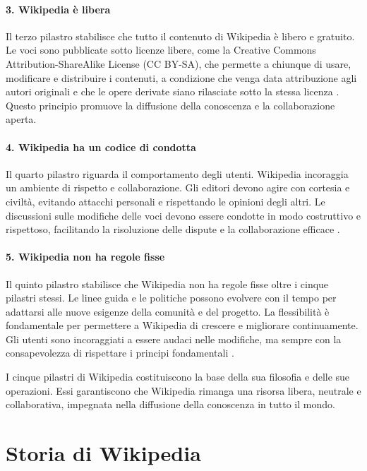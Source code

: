 \documentclass[12pt,a4paper]{report}
\begin{document}
\paragraph*{3. Wikipedia è libera}
Il terzo pilastro stabilisce che tutto il contenuto di Wikipedia è libero e gratuito. Le voci sono pubblicate sotto licenze libere, come la Creative Commons Attribution-ShareAlike License (CC BY-SA), che permette a chiunque di usare, modificare e distribuire i contenuti, a condizione che venga data attribuzione agli autori originali e che le opere derivate siano rilasciate sotto la stessa licenza \cite{jemielniak2014wikipedia}. Questo principio promuove la diffusione della conoscenza e la collaborazione aperta.

\paragraph*{4. Wikipedia ha un codice di condotta}
Il quarto pilastro riguarda il comportamento degli utenti. Wikipedia incoraggia un ambiente di rispetto e collaborazione. Gli editori devono agire con cortesia e civiltà, evitando attacchi personali e rispettando le opinioni degli altri. Le discussioni sulle modifiche delle voci devono essere condotte in modo costruttivo e rispettoso, facilitando la risoluzione delle dispute e la collaborazione efficace \cite{history_of_wikis}.

\paragraph*{5. Wikipedia non ha regole fisse}
Il quinto pilastro stabilisce che Wikipedia non ha regole fisse oltre i cinque pilastri stessi. Le linee guida e le politiche possono evolvere con il tempo per adattarsi alle nuove esigenze della comunità e del progetto. La flessibilità è fondamentale per permettere a Wikipedia di crescere e migliorare continuamente. Gli utenti sono incoraggiati a essere audaci nelle modifiche, ma sempre con la consapevolezza di rispettare i principi fondamentali \cite{reagle2010good}.

I cinque pilastri di Wikipedia costituiscono la base della sua filosofia e delle sue operazioni. Essi garantiscono che Wikipedia rimanga una risorsa libera, neutrale e collaborativa, impegnata nella diffusione della conoscenza in tutto il mondo.

\section{Storia di Wikipedia}
\end{document}
